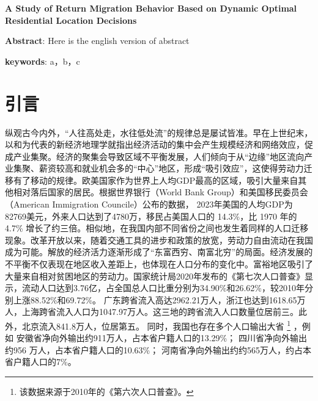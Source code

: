 \documentclass[a4paper, zihao=-4, fontset = mac, oneside]{ctexbook} %
\let\oldfootnote\footnote
\renewcommand{\footnote}[1]{%
  \oldfootnote{\setstretch{1.5}#1}%
}
\begin{document}
\begin{center}
    {
    \textbf{A Study of Return Migration Behavior Based on Dynamic Optimal Residential Location Decisions}
    }
\end{center}

{
\textbf{Abstract}: Here is the english version of abstract

\textbf{keywords}: a，b，c
}



\frontmatter
\renewcommand{\thepage}{\Roman{page}} %

%

\newpage
\tableofcontents
\thispagestyle{empty}

\mainmatter
\newpage
\chapter{引言}

纵观古今内外，“人往高处走，水往低处流”的规律总是屡试皆准。早在上世纪末，以\textcite{krugmanIncreasingReturnsEconomic1991}和\textcite{fujitaSpatialEconomyCities1999}为代表的新经济地理学就指出经济活动的集中会产生规模经济和网络效应，促成产业集聚。经济的聚集会导致区域不平衡发展，人们倾向于从“边缘”地区流向产业集聚、薪资较高和就业机会多的“中心”地区，形成“吸引效应”，这使得劳动力迁移有了移动的规律。欧美国家作为世界上人均GDP最高的区域，吸引大量来自其他相对落后国家的居民。根据世界银行（World Bank Group）和美国移民委员会（American Immigration Councile）公布的数据，
2023年美国的人均GDP为82769美元，外来人口达到了4780万，移民占美国人口的 14.3\%，比 1970 年的 4.7\% 增长了约三倍。相似地，在我国内部不同省份之间也发生着同样的人口迁移现象。改革开放以来，随着交通工具的进步和政策的放宽，劳动力自由流动在我国成为可能。解放的经济活力逐渐形成了“东富西穷、南富北穷”的局面。经济发展的不平衡不仅表现在地区收入差距上，也体现在人口分布的变化中。富裕地区吸引了大量来自相对贫困地区的劳动力。国家统计局2020年发布的《第七次人口普查》显示，流动人口达到3.76亿，占全国总人口比重分别为34.90\%和26.62\%，较2010年分别上涨88.52\%和69.72\%。
广东跨省流入高达2962.21万人，浙江也达到1618.65万人，上海跨省流入人口为1047.97万人。这三地的跨省流入人口数量位居前三。此外，北京流入841.8万人，位居第五。
同时，我国也存在多个人口输出大省\footnote{该数据来源于2010年的《第六次人口普查》。}，例如
安徽省净向外输出约911万人，占本省户籍人口的13.29\%；
四川省净向外输出约956 万人，占本省户籍人口的10.63\%；
河南省净向外输出约约565万人，约占本省户籍人口的7\%。
\end{document}
